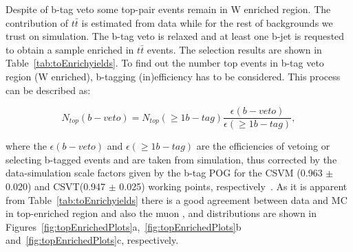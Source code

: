 Despite of b-tag veto some top-pair events remain in W enriched region. The contribution of $t\bar{t}$ is estimated from data while for the rest of backgrounds we trust on simulation. The b-tag veto is relaxed and at least one b-jet is requested to obtain a sample enriched in $t\bar{t}$ events. The selection results are shown in Table~\ref{tab:toEnrichyields}. To find out the number top events in b-tag veto region (W enriched), b-tagging (in)efficiency has to be considered. This process can be described as:
\begin{linenomath}
\begin{equation}
\label{eq:topEst}
N_{top}(b-veto) = N_{top}(\geq1b-tag) \frac{\epsilon(b-veto)}{\epsilon(\geq1b-tag)},
\end{equation}
\end{linenomath}
where the $\epsilon(b-veto)$ and $\epsilon(\geq1b-tag)$ are the efficiencies of vetoing or selecting b-tagged events and are taken from simulation, thus corrected by the data-simulation scale factors given by the b-tag POG for the CSVM (0.963 $\pm$ 0.020) and CSVT(0.947 $\pm$ 0.025) working points, respectively~\cite{CMS-BTV-AN-12-470}. As it is apparent from Table~\ref{tab:toEnrichyields} there is a good agreement between data and MC in top-enriched region and also the muon \pT, \mttwo and \mt distributions are shown in Figures~\ref{fig:topEnrichedPlots}a,~\ref{fig:topEnrichedPlots}b and~\ref{fig:topEnrichedPlots}c, respectively.


